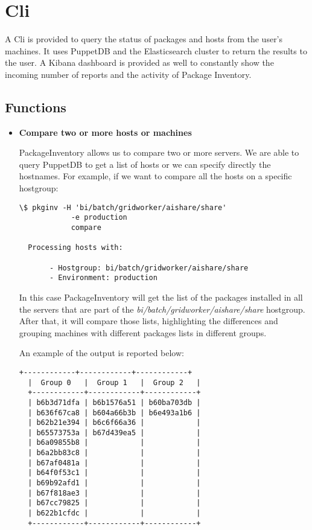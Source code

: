 \section{Cli}

A Cli is provided to query the status of packages and hosts from the
user's machines. It uses PuppetDB and the Elasticsearch cluster to return
the results to the user. A Kibana dashboard is provided as well to
constantly show the incoming number of reports and the activity of Package
Inventory.

\subsection{Functions}

\begin{itemize}
  \item \textbf{Compare two or more hosts or machines}

  PackageInventory allows us to compare two or more servers. We are able
  to query PuppetDB to get a list of hosts or we can specify directly the
  hostnames. For example, if we want to compare all the hosts on
  a specific hostgroup:
  
  \begin{lstlisting}[frame=single]
  \$ pkginv -H 'bi/batch/gridworker/aishare/share'
            -e production
            compare
  
  Processing hosts with:
  
       - Hostgroup: bi/batch/gridworker/aishare/share
       - Environment: production
  \end{lstlisting}

  In this case PackageInventory will get the list of the packages
  installed in all the servers that are part of the
  \textit{bi/batch/gridworker/aishare/share} hostgroup. After that, it
  will compare those lists, highlighting the differences and grouping
  machines with different packages lists in different groups.

  An example of the output is reported below:

  \begin{lstlisting}[frame=single]
  +------------+------------+------------+
  |  Group 0   |  Group 1   |  Group 2   |
  +------------+------------+------------+
  | b6b3d71dfa | b6b1576a51 | b60ba703db |
  | b636f67ca8 | b604a66b3b | b6e493a1b6 |
  | b62b21e394 | b6c6f66a36 |            |
  | b65573753a | b67d439ea5 |            |
  | b6a09855b8 |            |            |
  | b6a2bb83c8 |            |            |
  | b67af0481a |            |            |
  | b64f0f53c1 |            |            |
  | b69b92afd1 |            |            |
  | b67f818ae3 |            |            |
  | b67cc79825 |            |            |
  | b622b1cfdc |            |            |
  +------------+------------+------------+
  \end{lstlisting}


\end{itemize}
